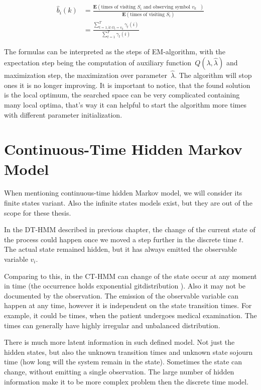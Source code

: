 \documentclass[thesis=M,english]{FITthesis}[2012/10/20]
\begin{document}
\begin{equation}
\begin{aligned}
\hat b_{i}(k) &= \frac{\mathbf{E}(\text{times of visiting $S_i$ and observing symbol $v_k$ })}
				   {\mathbf{E}(\text{times of visiting $S_i$})} \\
			  &= \frac{\sum\limits_{t=1, \text{if } O_t = v_k  }^{T} \gamma_t(i)}{\sum\limits_{t=1}^{T} \gamma_t(i) } 
\end{aligned}
\end{equation}

The formulas can be interpreted as the steps of EM-algorithm, with the expectation step being the computation of auxiliary function~$Q(\lambda,\hat\lambda)$ and maximization step, the maximization over parameter~$\hat\lambda$. The algorithm will stop ones it is no longer improving. It is important to notice, that the found solution is the local optimum, the searched space can be very complicated containing many local optima, that's way it can helpful to start the algorithm more times with different parameter initialization.  



\chapter{Continuous-Time Hidden Markov Model}

When mentioning continuous-time hidden Markov model, we will consider its finite states variant. Also the infinite states models exist, but they are out of the scope for these thesis.

In the DT-HMM described in previous chapter, the change of the current state of the process could happen once we moved a step further in the discrete time $t$. The actual state remained hidden, but it has always emitted the observable variable $v_i$.

Comparing to this, in the CT-HMM can change of the state occur at any moment in time (the occurrence holds exponential gitdistribution ). Also it may not be documented by the observation. The emission of the observable variable can happen at any time, however it is independent on the state transition times. For example, it could be times, when the patient undergoes medical examination. The times can generally have highly irregular and unbalanced distribution.

There is much more latent information in such defined model. Not just the hidden states, but also the unknown transition times and unknown state sojourn time (how long will the system remain in the state).
Sometimes the state can change, without emitting a single observation. The large number of hidden information make it to be more complex problem then the discrete time model.
\end{document}
